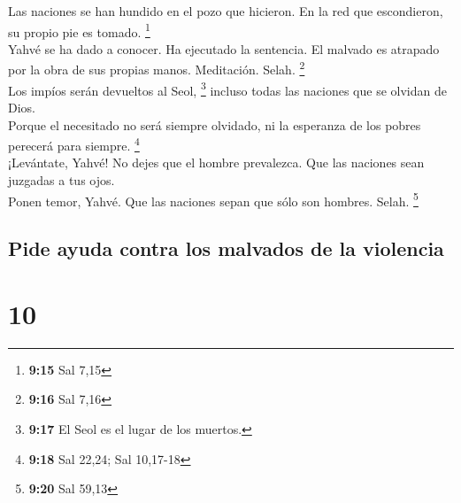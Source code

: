  Las naciones se han hundido en el pozo que hicieron. En
la red que escondieron, su propio pie es tomado. \footnote{\textbf{9:15}
  Sal 7,15}\\
 Yahvé se ha dado a conocer. Ha ejecutado la sentencia.
El malvado es atrapado por la obra de sus propias manos. Meditación.
Selah. \footnote{\textbf{9:16} Sal 7,16}\\
 Los impíos serán devueltos al Seol, \footnote{\textbf{9:17}
  El Seol es el lugar de los muertos.} incluso todas las naciones que se
olvidan de Dios.\\
 Porque el necesitado no será siempre olvidado, ni la
esperanza de los pobres perecerá para siempre. \footnote{\textbf{9:18}
  Sal 22,24; Sal 10,17-18}\\
 ¡Levántate, Yahvé! No dejes que el hombre prevalezca.
Que las naciones sean juzgadas a tus ojos.\\
 Ponen temor, Yahvé. Que las naciones sepan que sólo son
hombres. Selah. \footnote{\textbf{9:20} Sal 59,13}

\hypertarget{pide-ayuda-contra-los-malvados-de-la-violencia}{%
\subsection{Pide ayuda contra los malvados de la
violencia}\label{pide-ayuda-contra-los-malvados-de-la-violencia}}

\hypertarget{section-9}{%
\section{10}\label{section-9}}

